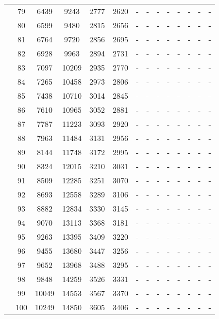 \begin{table}[htb]
{\begin{tabular}{|c|c|c|c|c|c|c|c|c|c|c|c|c|c|}
 \\
 & 
79 & 6439 & 9243 & 2777 & 2620
 & - & -
 & - & -
 & - & -
 & - & -
 \\
 & 
80 & 6599 & 9480 & 2815 & 2656
 & - & -
 & - & -
 & - & -
 & - & -
 \\
 & 
81 & 6764 & 9720 & 2856 & 2695
 & - & -
 & - & -
 & - & -
 & - & -
 \\
 & 
82 & 6928 & 9963 & 2894 & 2731
 & - & -
 & - & -
 & - & -
 & - & -
 \\
 & 
83 & 7097 & 10209 & 2935 & 2770
 & - & -
 & - & -
 & - & -
 & - & -
 \\
 & 
84 & 7265 & 10458 & 2973 & 2806
 & - & -
 & - & -
 & - & -
 & - & -
 \\
 & 
85 & 7438 & 10710 & 3014 & 2845
 & - & -
 & - & -
 & - & -
 & - & -
 \\
 & 
86 & 7610 & 10965 & 3052 & 2881
 & - & -
 & - & -
 & - & -
 & - & -
 \\
 & 
87 & 7787 & 11223 & 3093 & 2920
 & - & -
 & - & -
 & - & -
 & - & -
 \\
 & 
88 & 7963 & 11484 & 3131 & 2956
 & - & -
 & - & -
 & - & -
 & - & -
 \\
 & 
89 & 8144 & 11748 & 3172 & 2995
 & - & -
 & - & -
 & - & -
 & - & -
 \\
 & 
90 & 8324 & 12015 & 3210 & 3031
 & - & -
 & - & -
 & - & -
 & - & -
 \\
 & 
91 & 8509 & 12285 & 3251 & 3070
 & - & -
 & - & -
 & - & -
 & - & -
 \\
 & 
92 & 8693 & 12558 & 3289 & 3106
 & - & -
 & - & -
 & - & -
 & - & -
 \\
 & 
93 & 8882 & 12834 & 3330 & 3145
 & - & -
 & - & -
 & - & -
 & - & -
 \\
 & 
94 & 9070 & 13113 & 3368 & 3181
 & - & -
 & - & -
 & - & -
 & - & -
 \\
 & 
95 & 9263 & 13395 & 3409 & 3220
 & - & -
 & - & -
 & - & -
 & - & -
 \\
 & 
96 & 9455 & 13680 & 3447 & 3256
 & - & -
 & - & -
 & - & -
 & - & -
 \\
 & 
97 & 9652 & 13968 & 3488 & 3295
 & - & -
 & - & -
 & - & -
 & - & -
 \\
 & 
98 & 9848 & 14259 & 3526 & 3331
 & - & -
 & - & -
 & - & -
 & - & -
 \\
 & 
99 & 10049 & 14553 & 3567 & 3370
 & - & -
 & - & -
 & - & -
 & - & -
 \\
 & 
100 & 10249 & 14850 & 3605 & 3406
 & - & -
 & - & -
 & - & -
 & - & -
 \\
\hline
\end{tabular}}
\end{table}